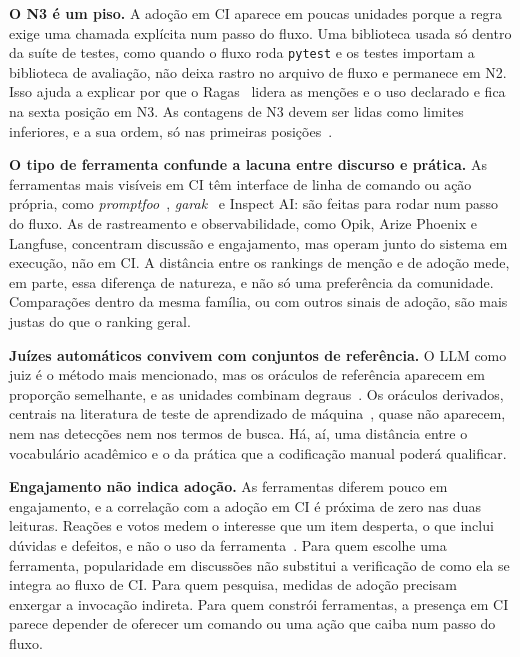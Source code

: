 \documentclass[sigconf]{acmart}
\begin{document}
\textbf{O N3 é um piso.} A adoção em CI aparece em poucas unidades porque a regra exige uma chamada explícita num passo do fluxo. Uma biblioteca usada só dentro da suíte de testes, como quando o fluxo roda \texttt{pytest} e os testes importam a biblioteca de avaliação, não deixa rastro no arquivo de fluxo e permanece em N2. %
Isso ajuda a explicar por que o Ragas~\cite{es2024ragas} lidera as menções e o uso declarado e fica na sexta posição em N3. As contagens de N3 devem ser lidas como limites inferiores, e a sua ordem, só nas primeiras posições~\cite{kalliamvakou2014promises}.

\textbf{O tipo de ferramenta confunde a lacuna entre discurso e prática.} As ferramentas mais visíveis em CI têm interface de linha de comando ou ação própria, como \textit{promptfoo}~\cite{promptfoo}, \textit{garak}~\cite{derczynski2024garak} e Inspect AI: são feitas para rodar num passo do fluxo. As de rastreamento e observabilidade, como Opik, Arize Phoenix e Langfuse, concentram discussão e engajamento, mas operam junto do sistema em execução, não em CI. A distância entre os rankings de menção e de adoção mede, em parte, essa diferença de natureza, e não só uma preferência da comunidade. Comparações dentro da mesma família, ou com outros sinais de adoção, são mais justas do que o ranking geral.

\textbf{Juízes automáticos convivem com conjuntos de referência.} O LLM como juiz é o método mais mencionado, mas os oráculos de referência aparecem em proporção semelhante, e as unidades combinam degraus~\cite{barr2015oracle,zheng2023judging}. Os oráculos derivados, centrais na literatura de teste de aprendizado de máquina~\cite{zhang2022mltesting}, quase não aparecem, nem nas detecções nem nos termos de busca. Há, aí, uma distância entre o vocabulário acadêmico e o da prática que a codificação manual poderá qualificar.

\textbf{Engajamento não indica adoção.} As ferramentas diferem pouco em engajamento, e a correlação com a adoção em CI é próxima de zero nas duas leituras. Reações e votos medem o interesse que um item desperta, o que inclui dúvidas e defeitos, e não o uso da ferramenta~\cite{borges2018star}. Para quem escolhe uma ferramenta, popularidade em discussões não substitui a verificação de como ela se integra ao fluxo de CI. Para quem pesquisa, medidas de adoção precisam enxergar a invocação indireta. Para quem constrói ferramentas, a presença em CI parece depender de oferecer um comando ou uma ação que caiba num passo do fluxo.
\end{document}

